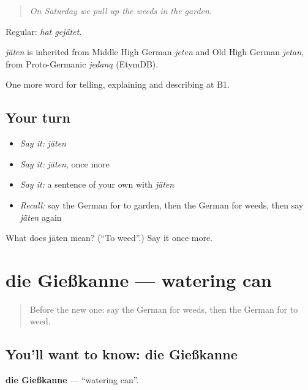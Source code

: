 \begin{quote}
\emph{On Saturday we pull up the weeds in the garden.}
\end{quote}

Regular: \emph{hat gejätet}.

\begin{cousinweb}
\emph{jäten} is inherited from Middle High German \emph{jeten} and Old High German \emph{jetan}, from Proto-Germanic \emph{jedaną} (EtymDB).
\end{cousinweb}

\begin{grammarlens}[title={What you've built}]
One more word for telling, explaining and describing at B1.
\end{grammarlens}

\subsection*{Your turn}
\begin{itemize}
\raggedright
  \item \emph{Say it:} \emph{jäten}
  \item \emph{Say it:} \emph{jäten}, once more
  \item \emph{Say it:} a sentence of your own with \emph{jäten}
  \item \emph{Recall:} say the German for to garden, then the German for weeds, then say \emph{jäten} again
\end{itemize}

\begin{tcolorbox}[breakable,colback=teal!4,colframe=teal!35!black,title={Before you move on}]
What does jäten mean? (\textquotedblleft{}To weed\textquotedblright{}.) Say it once more.
\end{tcolorbox}
\section[die Gießkanne]{die Gießkanne — watering can}

\label{lesson:GE-C503-giesskanne}



\begin{quote}
Before the new one: say the German for weeds, then the German for to weed.
\end{quote}

\subsection*{You'll want to know: die Gießkanne}
\textbf{die Gießkanne} — \textquotedblleft{}watering can\textquotedblright{}.

